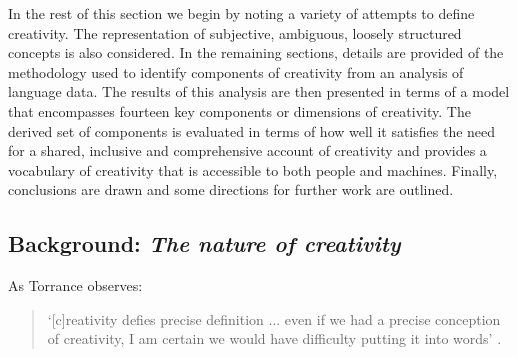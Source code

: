 \documentclass[10pt,letterpaper]{article}
\begin{document}

In the rest of this section we begin by noting a variety of attempts to define creativity. The representation of subjective, ambiguous, loosely structured concepts is also considered.
In the remaining sections, details are provided of the methodology used to identify components of creativity from an analysis of language data. The results of this analysis are then presented in terms of a model that encompasses fourteen key components or dimensions of creativity. The derived set of components is evaluated in terms of how well it satisfies the need for a shared, inclusive and comprehensive account of creativity and provides a vocabulary of creativity that is accessible to both people and machines. Finally, conclusions are drawn and some directions for further work are outlined.

\subsection*{Background:  {\em The nature of creativity}} \label{background}

As Torrance observes:

\begin{quote}
`[c]reativity defies precise definition ... even if we had a precise conception of creativity, I am certain we would have difficulty putting it into words' \cite[p. 43]{torrance88}. 
\end{quote}
\end{document}
